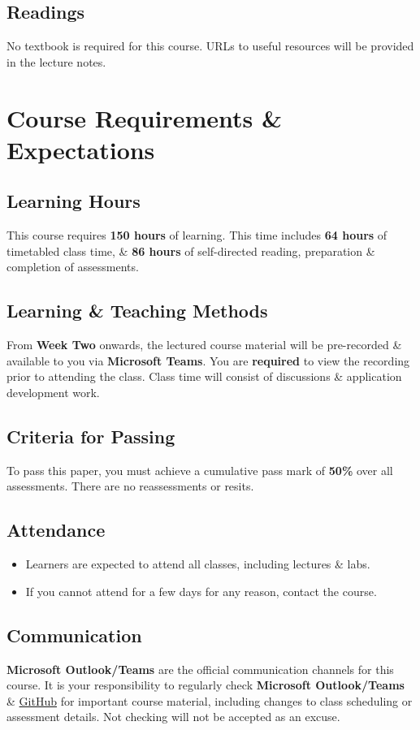 \documentclass{article}
\begin{document}
\subsection*{Readings}
No textbook is required for this course. URLs to useful resources will be provided in the lecture notes.

\section*{Course Requirements \& Expectations}

\subsection*{Learning Hours}
This course requires \textbf{150 hours} of learning. This time includes \textbf{64 hours} of timetabled class time, \& \textbf{86 hours} of self-directed reading, preparation \& completion of assessments.

\subsection*{Learning \& Teaching Methods}
From \textbf{Week Two} onwards, the lectured course material will be pre-recorded \& available to you via \textbf{Microsoft Teams}. You are \textbf{required} to view the recording prior to attending the class. Class time will consist of discussions \& application development work.  

\subsection*{Criteria for Passing}
To pass this paper, you must achieve a cumulative pass mark of \textbf{50\%} over all assessments. There are no reassessments or resits.

\subsection*{Attendance}
\begin{itemize}
	\item Learners are expected to attend all classes, including lectures \& labs.
	\item If you cannot attend for a few days for any reason, contact the course.
\end{itemize}

\subsection*{Communication}
\textbf{Microsoft Outlook/Teams} are the official communication channels for this course. It is your responsibility to regularly check \textbf{Microsoft Outlook/Teams} \& \href{https://github.com/otago-polytechnic-bit-courses/ID607001-intro-app-dev-concepts}{GitHub} for important course material, including changes to class scheduling or assessment details. Not checking will not be accepted as an excuse.
\end{document}
